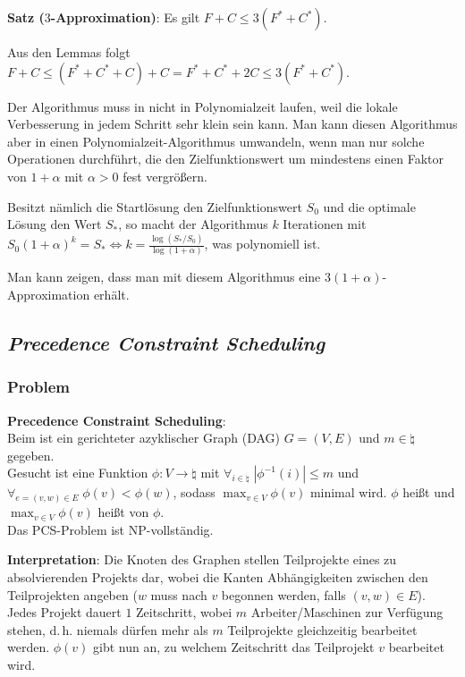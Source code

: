 \textbf{Satz ($3$-Approximation)}:
Es gilt $F + C \le 3(F^\ast + C^\ast)$.

\begin{Beweis}
    Aus den Lemmas folgt
    $F + C
    \le (F^\ast + C^\ast + C) + C
    = F^\ast + C^\ast + 2C
    \le 3(F^\ast + C^\ast)$.
\end{Beweis}

\linie

Der Algorithmus muss in nicht in Polynomialzeit laufen, weil die lokale
Verbesserung in jedem Schritt sehr klein sein kann.
Man kann diesen Algorithmus aber in einen Polynomialzeit-Algorithmus umwandeln,
wenn man nur solche Operationen durchführt,
die den Zielfunktionswert um mindestens einen Faktor von $1 + \alpha$ mit $\alpha > 0$
fest vergrößern.

Besitzt nämlich die Startlösung den Zielfunktionswert $S_0$ und die optimale Lösung den Wert
$S_\ast$,
so macht der Algorithmus $k$ Iterationen mit
$S_0 (1+\alpha)^k = S_\ast \iff k = \frac{\log(S_\ast/S_0)}{\log(1 + \alpha)}$,
was polynomiell ist.

Man kann zeigen, dass man mit diesem Algorithmus eine $3(1 + \alpha)$-Approximation erhält.

\pagebreak

\subsection{%
    \emph{Precedence Constraint Scheduling}%
}

\subsubsection{%
    Problem%
}

\textbf{Precedence Constraint Scheduling}:\\
Beim  ist
ein gerichteter azyklischer Graph (DAG) $G = (V, E)$ und $m \in \natural$ gegeben.\\
Gesucht ist eine Funktion $\phi\colon V \to \natural$ mit
$\forall_{i \in \natural}\; |\phi^{-1}(i)| \le m$ und
$\forall_{e = (v,w) \in E}\; \phi(v) < \phi(w)$, sodass $\max_{v \in V} \phi(v)$ minimal wird.
$\phi$ heißt  und $\max_{v \in V} \phi(v)$ heißt  von $\phi$.\\
Das PCS-Problem ist NP-vollständig.

\textbf{Interpretation}:
Die Knoten des Graphen stellen Teilprojekte eines zu absolvierenden Projekts dar,
wobei die Kanten Abhängigkeiten zwischen den Teilprojekten angeben
($w$ muss nach $v$ begonnen werden, falls $(v, w) \in E$).
Jedes Projekt dauert $1$ Zeitschritt,
wobei $m$ Arbeiter/Maschinen zur Verfügung stehen,
d.\,h. niemals dürfen mehr als $m$ Teilprojekte gleichzeitig bearbeitet werden.
$\phi(v)$ gibt nun an, zu welchem Zeitschritt das Teilprojekt $v$ bearbeitet wird.

